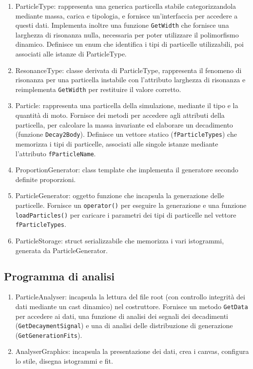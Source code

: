 \documentclass[12pt, a4paper]{article}
\begin{document}
\begin{enumerate}
\item ParticleType: rappresenta una generica particella stabile categorizzandola mediante massa, carica e tipologia, e fornisce un'interfaccia per accedere a questi dati. Implementa inoltre una funzione \verb!GetWidth! che fornisce una larghezza di risonanza nulla, necessaria per poter utilizzare il polimorfismo dinamico. 
Definisce un enum che identifica i tipi di particelle utilizzabili, poi associati alle istanze di ParticleType.

\item ResonanceType: classe derivata di ParticleType, rappresenta il fenomeno di risonanza per una particella instabile con l'attributo larghezza di risonanza e reimplementa \verb!GetWidth! per restituire il valore corretto. 

\item Particle: rappresenta una particella della simulazione, mediante il tipo e la quantità di moto. 
Fornisce dei metodi per accedere agli attributi della particella, per calcolare la massa invariante ed elaborare un decadimento (funzione \verb!Decay2Body!).
Definisce un vettore statico (\verb!fParticleTypes!) che memorizza i tipi di particelle, associati alle singole istanze mediante l'attributo \verb!fParticleName!.

\item ProportionGenerator: class template che implementa il generatore secondo definite proporzioni. 
\item ParticleGenerator: oggetto funzione che incapsula la generazione delle particelle. 
Fornisce un \verb!operator()! per eseguire la generazione e una funzione \verb!loadParticles()! per caricare i parametri dei tipi di particelle nel vettore \verb!fParticleTypes!.

\item ParticleStorage: struct serializzabile che memorizza i vari istogrammi, generata da ParticleGenerator.

\end{enumerate}

\subsection{Programma di analisi}

\begin{enumerate}
\item ParticleAnalyser: incapsula la lettura del file root (con controllo integrità dei dati mediante un cast dinamico) nel costruttore. Fornisce un metodo \verb!GetData! per accedere ai dati, una funzione di analisi dei segnali dei decadimenti (\verb!GetDecaymentSignal!) e una di analisi delle distribuzione di generazione (\verb!GetGenerationFits!). 

\item AnalyserGraphics: incapsula la presentazione dei dati, crea i canvas, configura lo stile, disegna istogrammi e fit.


\end{enumerate}
\end{document}
